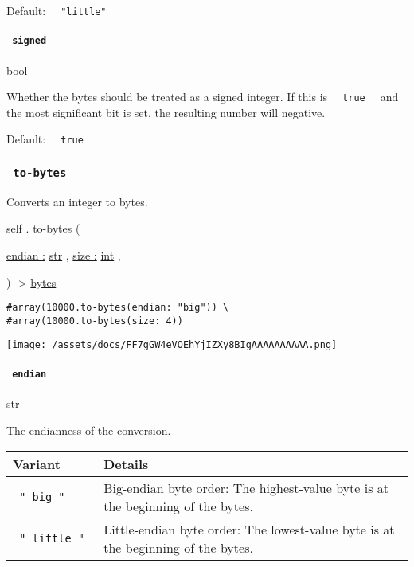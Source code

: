 Default: \texttt{\ }{\texttt{\ "little"\ }}\texttt{\ }

\paragraph{\texorpdfstring{\texttt{\ signed\ }}{ signed }}\label{definitions-from-bytes-signed}

\href{/docs/reference/foundations/bool/}{bool}

Whether the bytes should be treated as a signed integer. If this is
\texttt{\ }{\texttt{\ true\ }}\texttt{\ } and the most significant bit
is set, the resulting number will negative.

Default: \texttt{\ }{\texttt{\ true\ }}\texttt{\ }

\subsubsection{\texorpdfstring{\texttt{\ to-bytes\ }}{ to-bytes }}\label{definitions-to-bytes}

Converts an integer to bytes.

self { . } { to-bytes } (

{ \hyperref[definitions-to-bytes-parameters-endian]{endian :}
\href{/docs/reference/foundations/str/}{str} , } {
\hyperref[definitions-to-bytes-parameters-size]{size :}
\href{/docs/reference/foundations/int/}{int} , }

) -\textgreater{} \href{/docs/reference/foundations/bytes/}{bytes}

\begin{verbatim}
#array(10000.to-bytes(endian: "big")) \
#array(10000.to-bytes(size: 4))
\end{verbatim}

\texttt{[image: /assets/docs/FF7gGW4eVOEhYjIZXy8BIgAAAAAAAAAA.png]}

\paragraph{\texorpdfstring{\texttt{\ endian\ }}{ endian }}\label{definitions-to-bytes-endian}

\href{/docs/reference/foundations/str/}{str}

The endianness of the conversion.

\begin{longtable}[]{@{}ll@{}}
\toprule\noalign{}
Variant & Details \\
\midrule\noalign{}
\endhead
\bottomrule\noalign{}
\endlastfoot
\texttt{\ "\ big\ "\ } & Big-endian byte order: The highest-value byte
is at the beginning of the bytes. \\
\texttt{\ "\ little\ "\ } & Little-endian byte order: The lowest-value
byte is at the beginning of the bytes. \\
\end{longtable}

